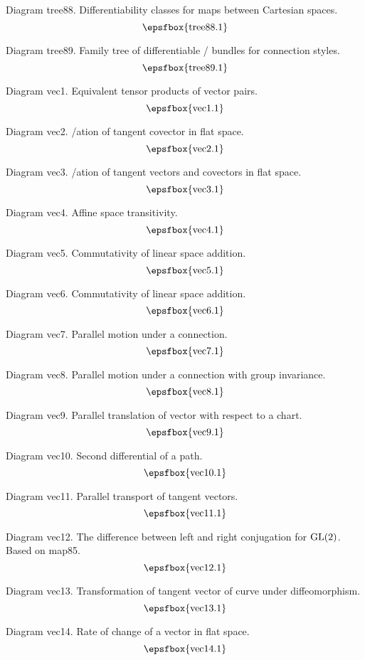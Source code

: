 Diagram tree88. Differentiability classes for maps between Cartesian spaces.
$$
\centerline{\epsfbox{tree88.1}}
$$

Diagram tree89. Family tree of differentiable \fibre/ bundles for connection
styles.
$$
\centerline{\epsfbox{tree89.1}}
$$

\secteject
\edef\SECTvec{\the\pageno}

Diagram vec1. Equivalent tensor products of vector pairs.
$$
\centerline{\epsfbox{vec1.1}}
$$

Diagram vec2. \Visualis/ation of tangent covector in flat space.
$$
\centerline{\epsfbox{vec2.1}}
$$

Diagram vec3. \Visualis/ation of tangent vectors and covectors in flat space.
$$
\centerline{\epsfbox{vec3.1}}
$$

Diagram vec4. Affine space transitivity.
$$
\centerline{\epsfbox{vec4.1}}
$$

Diagram vec5. Commutativity of linear space addition.
$$
\centerline{\epsfbox{vec5.1}}
$$

\filleject

Diagram vec6. Commutativity of linear space addition.
$$
\centerline{\epsfbox{vec6.1}}
$$

Diagram vec7. Parallel motion under a connection.
$$
\centerline{\epsfbox{vec7.1}}
$$

Diagram vec8. Parallel motion under a connection with group invariance.
$$
\centerline{\epsfbox{vec8.1}}
$$

Diagram vec9. Parallel translation of vector with respect to a chart.
$$
\centerline{\epsfbox{vec9.1}}
$$

Diagram vec10. Second differential of a path.
$$
\centerline{\epsfbox{vec10.1}}
$$

\filleject

Diagram vec11. Parallel transport of tangent vectors.
$$
\centerline{\epsfbox{vec11.1}}
$$

Diagram vec12. The difference between left and right conjugation for
$\gp{GL}(2)$. Based on map85.
$$
\centerline{\epsfbox{vec12.1}}
$$

Diagram vec13. Transformation of tangent vector of curve under diffeomorphism.
$$
\centerline{\epsfbox{vec13.1}}
$$

Diagram vec14. Rate of change of a vector in flat space.
$$
\centerline{\epsfbox{vec14.1}}
$$

